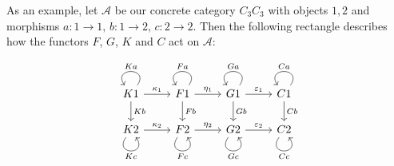 \begin{example}

As an example, let $\mathcal{A}$ be our concrete category $C_{3}C_{3}$ with objects $1,2$ and morphisms
$a : 1\rightarrow 1,\, b : 1 \rightarrow 2,\, c : 2 \rightarrow 2$. Then the following rectangle describes how the functors $F$, $G$, $K$ and $C$
act on $\mathcal{A}$:

\[
\begin{tikzcd}
K1 \arrow["Ka"', loop, distance=2em, in=125, out=55] \arrow[d, "Kb"] \arrow[r, "\kappa_{1}"] & F1 \arrow["Fa"', loop, distance=2em, in=125, out=55] \arrow[d, "Fb"] \arrow[r, "\eta_{1}"] & G1 \arrow["Ga"', loop, distance=2em, in=125, out=55] \arrow[d, "Gb"] \arrow[r, "\varepsilon_{1}"] & C1 \arrow[d, "Cb"] \arrow["Ca"', loop, distance=2em, in=125, out=55] \\
K2 \arrow["Kc"', loop, distance=2em, in=305, out=235] \arrow[r, "\kappa_{2}"]                & F2 \arrow["Fc"', loop, distance=2em, in=305, out=235] \arrow[r, "\eta_{2}"]                & G2 \arrow["Gc"', loop, distance=2em, in=305, out=235] \arrow[r, "\varepsilon_{2}"]                & C2 \arrow["Cc"', loop, distance=2em, in=305, out=235]               
\end{tikzcd}
\]


\end{example}
